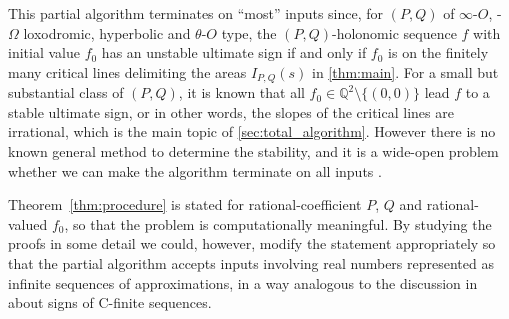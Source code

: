 \documentclass[a4paper,UKenglish,cleveref,autoref,thm-restate]{lipics-v2021}
\newcommand{\Q}{\mathbb{Q}}
\begin{document}
This partial algorithm terminates on ``most'' inputs since, for $(P, Q)$ of $\infty$-$O$, -$\Omega$ loxodromic, hyperbolic and $\theta$-$O$ type, the $(P, Q)$-holonomic sequence $f$ with initial value $f_0$ has an unstable ultimate sign if and only if $f_0$ is on the finitely many critical lines delimiting the areas $I_{P, Q}(s)$ in \cref{thm:main}. 
For a small but substantial class of $(P, Q)$, it is known that all $f_0 \in \Q^2 \setminus \{(0, 0) \}$ lead $f$ to a stable ultimate sign, or in other words, the slopes of the critical lines are irrational, which is the main topic of \cref{sec:total_algorithm}. 
However there is no known general method to determine the stability, and it is a wide-open problem whether we can make the algorithm terminate on all inputs \cite{KKL+21,IS24,NOW21}. 







Theorem~\ref{thm:procedure} is stated for  
rational-coefficient $P$, $Q$ and rational-valued $f _0$, 
so that the problem is computationally meaningful. 
By studying the proofs in some detail 
we could, however, modify the statement appropriately 
so that the partial algorithm accepts inputs involving real numbers
represented as infinite sequences of approximations, 
in a way analogous to the discussion in \cite{Neu21}
about signs of C-finite sequences. 
\end{document}
